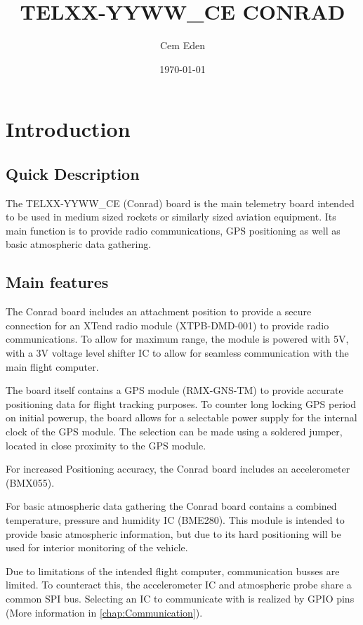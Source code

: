 \documentclass[12pt,article]{memoir}
\title{TELXX-YYWW\_CE CONRAD}
\author{Cem Eden}
\date{\today}
\begin{document}
	


\tableofcontents*
\clearpage


\chapter{Introduction}
\section{Quick Description}
The TELXX-YYWW\_CE (Conrad) board is the main telemetry board intended to be used in medium sized rockets or similarly sized aviation equipment. Its main function is to provide radio communications, GPS positioning as well as basic atmospheric data gathering.\par

\section{Main features}
The Conrad board includes an attachment position to provide a secure connection for an XTend radio module (XTPB-DMD-001) to provide radio communications. To allow for maximum range, the module is powered with 5V, with a 3V voltage level shifter IC to allow for seamless communication with the main flight computer.\par
The board itself contains a GPS module (RMX-GNS-TM) to provide accurate positioning data for flight tracking purposes. To counter long locking GPS period on initial powerup, the board allows for a selectable power supply for the internal clock of the GPS module. The selection can be made using a soldered jumper, located in close proximity to the GPS module.\par
For increased Positioning accuracy, the Conrad board includes an accelerometer (BMX055).\par
For basic atmospheric data gathering the Conrad board contains a combined temperature, pressure and humidity IC (BME280). This module is intended to provide basic atmospheric information, but due to its hard positioning will be used for interior monitoring of the vehicle.\par
Due to limitations of the intended flight computer, communication busses are limited. To counteract this, the accelerometer IC and atmospheric probe share a common SPI bus. Selecting an IC to communicate with is realized by GPIO pins (More information in \autoref{chap:Communication}).\par
\end{document}
